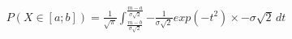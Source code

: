 \documentclass[preview]{standalone}
\begin{document}
\begin{align*}
P( X \in [a;b] ) = { \frac{1}{\sqrt{\pi}} } \int_{\frac{m - b}{\sigma \sqrt{2}} }^{ \frac{m - a}{\sigma \sqrt{2}} } { { - \frac{1}{\sigma \sqrt{2}} } exp( -t^2 ) \times - \sigma \sqrt{2} } \, dt
\end{align*}
\end{document}
